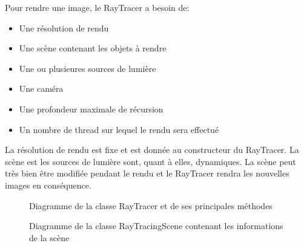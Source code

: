 \documentclass[../../Raaport RayTracer]{subfiles}
\begin{document}
Pour rendre une image, le RayTracer a besoin de:
\begin{itemize}
	\item{Une résolution de rendu}
	\item{Une scène contenant les objets à rendre}
	\item{Une ou plusieures sources de lumière}
	\item{Une caméra}
	\item{Une profondeur maximale de récursion}
	\item{Un nombre de thread sur lequel le rendu sera effectué}
\end{itemize}
La résolution de rendu est fixe et est donnée au constructeur du RayTracer. La scène est les sources de lumière sont, quant à elles, dynamiques. La scène peut très bien être modifiée pendant le rendu et le RayTracer rendra les nouvelles images en conséquence.

\begin{figure}[h!]
	
	\caption{Diagramme de la classe RayTracer et de ses principales méthodes}
	\label{diagrammeRayTracer}
\end{figure}
\FloatBarrier

\begin{figure}[h!]
	
	\caption{Diagramme de la classe RayTracingScene contenant les informations de la scène}
	\label{diagrammeRayTracingScene}
\end{figure}
\FloatBarrier
\end{document}

